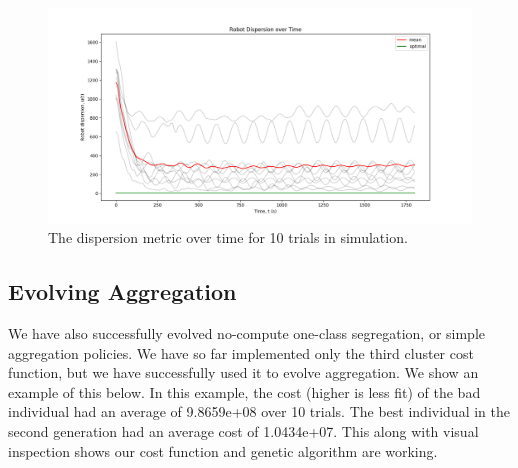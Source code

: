 \documentclass[conference]{IEEEtran}
\begin{document}
  \begin{figure}
    \centering
    \includegraphics[width=1\linewidth]{./images/robot_dispersion_over_10_trials.png}
    \caption{The dispersion metric over time for 10 trials in simulation.}
    \label{fig:dispersion_gauci}
  \end{figure}

  \subsection{Evolving Aggregation}

  We have also successfully evolved no-compute one-class segregation, or simple aggregation policies. We have so far implemented only the third cluster cost function, but we have successfully used it to evolve aggregation. We show an example of this below. In this example, the cost (higher is less fit) of the bad individual had an average of 9.8659e+08 over 10 trials. The best individual in the second generation had an average cost of 1.0434e+07. This along with visual inspection shows our cost function and genetic algorithm are working.
  
\end{document}
